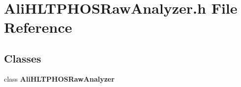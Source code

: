 \section{Ali\-HLTPHOSRaw\-Analyzer.h File Reference}
\label{AliHLTPHOSRawAnalyzer_8h}
\subsection*{Classes}
\begin{CompactItemize}
\item 
class {\bf Ali\-HLTPHOSRaw\-Analyzer}
\end{CompactItemize}
